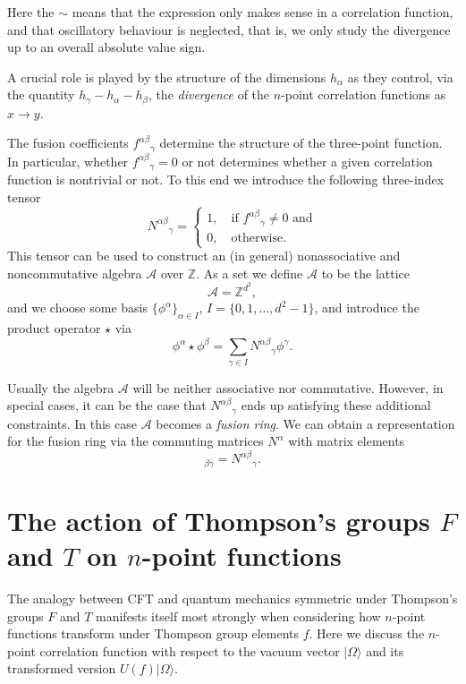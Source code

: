 \documentclass[11pt,oneside]{amsart}
\theoremstyle{plain}%
\theoremstyle{definition}
\theoremstyle{remark}
\begin{document}
Here the $\sim$ means that the expression only makes sense in a correlation function, and that oscillatory behaviour is neglected, that is, we only study the divergence up to an overall absolute value sign.

A crucial role is played by the structure of the dimensions $h_\alpha$ as they control, via the quantity $h_\gamma-h_\alpha-h_\beta$, the \emph{divergence} of the $n$-point correlation functions as $x\rightarrow y$.


The fusion coefficients ${f^{\alpha\beta}}_{\gamma}$ determine the structure of the three-point function. In particular, whether ${f^{\alpha\beta}}_{\gamma}=0$ or not determines whether a given correlation function is nontrivial or not. To this end we introduce the following three-index tensor
\begin{equation}
	{N^{\alpha\beta}}_\gamma = \begin{cases}
		1, \quad \text{if ${f^{\alpha\beta}}_{\gamma}\not=0$ and}\\ 0,\quad \text{otherwise.}
	\end{cases}
\end{equation}
This tensor can be used to construct an (in general) nonassociative and noncommutative algebra $\mathcal{A}$ over $\mathbb{Z}$. As a set we define $\mathcal{A}$ to be the lattice
\begin{equation}
	\mathcal{A} = \mathbb{Z}^{d^2},
\end{equation}
and we choose some basis $\{\phi^\alpha\}_{\alpha\in I}$, $I=\{0,1,\ldots,d^2-1\}$, and introduce the product operator $\star$ via
\begin{equation}
	\phi^\alpha\star \phi^\beta = \sum_{\gamma\in I} {N^{\alpha\beta}}_\gamma \phi^\gamma.
\end{equation}

Usually the algebra $\mathcal{A}$ will be neither associative nor commutative. However, in special cases, it can be the case that ${N^{\alpha\beta}}_\gamma$ ends up satisfying these additional constraints. In this case $\mathcal{A}$ becomes a \emph{fusion ring}. We can obtain a representation for the fusion ring via the commuting matrices $N^\alpha$ with matrix elements
\begin{equation}
	[N^\alpha]_{\beta\gamma} = {N^{\alpha\beta}}_\gamma.
\end{equation}

\section{\texorpdfstring{The action of Thompson's groups $F$ and $T$ on $n$-point functions}{The action of Thompson's groups F and T on n-point functions}}\label{sec:thompsonaction}
The analogy between CFT and quantum mechanics symmetric under Thompson's groups $F$ and $T$ manifests itself most strongly when considering how $n$-point
functions transform under Thompson group elements $f$. Here we discuss the $n$-point correlation function with respect to the vacuum vector $|\Omega\rangle$ and its transformed version $U(f)|\Omega\rangle$.
\end{document}
